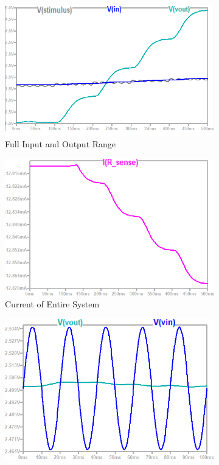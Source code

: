 \begin{figure}[h]
 \footnotesize
 \centering
    \begin{subfigure}[]{0.45\textwidth}
              \centering
  		\includegraphics[width=1\linewidth]{./Figures/vout}
		    \caption{Full Input and Output Range} \label{subfig:vout}
     \end{subfigure}
     \begin{subfigure}[]{0.45\textwidth}
             \centering
  		\includegraphics[width=1\linewidth]{./Figures/current1}
		   \caption{Current of Entire System} \label{subfig:current}
     \end{subfigure}
    \begin{subfigure}[]{0.45\textwidth}
              \centering
              \vspace{0.5cm}
  		\includegraphics[width=1\linewidth]{./Figures/noise}

\end{subfigure}
\end{figure}
